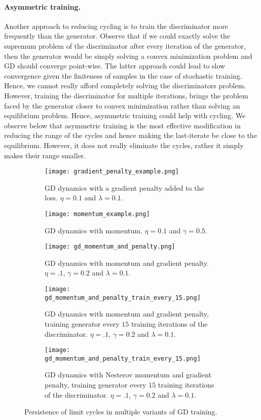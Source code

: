 \paragraph{Asymmetric training.} Another approach to reducing cycling is to train the discriminator more frequently than the generator. Observe that if we could exactly solve the supremum problem of the discriminator after every iteration of the generator, then the generator would be simply solving a convex minimization problem and GD should converge point-wise. The latter approach could lead to slow convergence given the finiteness of samples in the case of stochastic training. Hence, we cannot really afford completely solving the discriminators problem. However, training the discriminator for multiple iterations, brings the problem faced by the generator closer to convex minimization rather than solving an equilibrium problem. Hence, asymmetric training could help with cycling. We observe below that asymmetric training is the most effective modification in reducing the range of the cycles and hence making the last-iterate be close to the equilibrium. However, it does not really eliminate the cycles, rather it simply makes their range smaller.
\newpage
\begin{figure}[H]
    \centering
    \begin{subfigure}[b]{1\textwidth}
        \centering
        \texttt{[image: gradient\_penalty\_example.png]}
        \caption{GD dynamics with a gradient penalty added to the loss. $\eta=0.1$ and $\lambda=0.1$.}
    \end{subfigure}
    \begin{subfigure}[b]{1\textwidth}
        \centering
        \texttt{[image: momentum\_example.png]}
        \caption{GD dynamics with momentum. $\eta=0.1$ and $\gamma=0.5$.}
    \end{subfigure}
    \begin{subfigure}[b]{1\textwidth}
        \centering
        \texttt{[image: gd\_momentum\_and\_penalty.png]}
        \caption{GD dynamics with momentum and gradient penalty. $\eta=.1$, $\gamma=0.2$ and $\lambda=0.1$.}
    \end{subfigure}
    \begin{subfigure}[b]{1\textwidth}
        \centering
        \texttt{[image: gd\_momentum\_and\_penalty\_train\_every\_15.png]}
        \caption{GD dynamics with momentum and gradient penalty, training generator every $15$ training iterations of the discriminator. $\eta=.1$, $\gamma=0.2$ and $\lambda=0.1$.}
    \end{subfigure}
    \begin{subfigure}[b]{1\textwidth}
        \centering
        \texttt{[image: gd\_momentum\_and\_penalty\_train\_every\_15.png]}
        \caption{GD dynamics with Nesterov momentum and gradient penalty, training generator every $15$ training iterations of the discriminator. $\eta=.1$, $\gamma=0.2$ and $\lambda=0.1$.}
    \end{subfigure}
    \caption{Persistence of limit cycles in multiple variants of GD training.}\label{fig:persistence}
\end{figure}